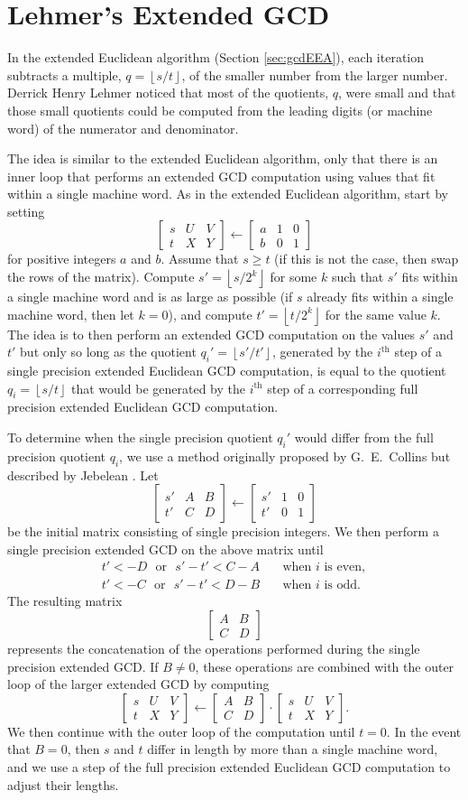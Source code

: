 \documentclass{ucalgthes1}
\theoremstyle{definition}
\newcommand{\matrixtt}[4]{\left[ \begin{array}{rr} #1 & #2 \\ #3 & #4 \end{array} \right]}
\newcommand{\matrixThreeTwo}[6]{\left[ \begin{array}{rrr} #1 & #2 & #3 \\ #4 & #5 & #6 \end{array} \right]}
\newcommand{\floor}[1]{\left\lfloor #1 \right\rfloor}
\newcommand{\ith}{i^{\textrm{th}}}
\begin{document}
\section{Lehmer's Extended GCD}
\label{sec:gcdLehmer}


In the extended Euclidean algorithm (Section \ref{sec:gcdEEA}), each iteration subtracts a multiple, \mbox{$q = \floor{s / t}$}, of the smaller number from the larger number.  Derrick Henry Lehmer \cite{Lehmer1938} noticed that most of the quotients, $q$, were small and that those small quotients could be computed from the leading digits (or machine word) of the numerator and denominator.

The idea is similar to the extended Euclidean algorithm, only that there is an inner loop that performs an extended GCD computation using values that fit within a single machine word.  As in the extended Euclidean algorithm, start by setting
\[
	\matrixThreeTwo{s}{U}{V}{t}{X}{Y} \gets \matrixThreeTwo{a}{1}{0}{b}{0}{1}
\]
for positive integers $a$ and $b$.  Assume that $s \ge t$ (if this is not the case, then swap the rows of the matrix).  Compute $s'=\floor{s/2^k}$ for some $k$ such that $s'$ fits within a single machine word and is as large as possible (if $s$ already fits within a single machine word, then let $k=0$), and compute $t' = \floor{t/2^k}$ for the same value $k$.  The idea is to then perform an extended GCD computation on the values $s'$ and $t'$ but only so long as the quotient ${q_i}' = \floor{s'/t'}$, generated by the $\ith$ step of a single precision extended Euclidean GCD computation, is equal to the quotient $q_i=\floor{s/t}$ that would be generated by the $\ith$ step of a corresponding full precision extended Euclidean GCD computation.

To determine when the single precision quotient ${q_i}'$ would differ from the full precision quotient $q_i$, we use a method originally proposed by G.\ E.\ Collins but described by Jebelean \cite[Theorem 1]{Jebelean1993}.  Let
\[
\matrixThreeTwo{s'}{A}{B}{t'}{C}{D} \gets \matrixThreeTwo{s'}{1}{0}{t'}{0}{1}
\]
be the initial matrix consisting of single precision integers.  We then perform a single precision extended GCD on the above matrix until
\begin{align*}
  t' < -D \textrm{~~or~~} s' - t' < C - A &\textrm{~~~when $i$ is even}, \\
  t' < -C \textrm{~~or~~} s' - t' < D - B &\textrm{~~~when $i$ is odd}.
\end{align*}
The resulting matrix
\[
	\matrixtt{A}{B}{C}{D}
\]
represents the concatenation of the operations performed during the single precision extended GCD.  If $B \neq 0$, these operations are combined with the outer loop of the larger extended GCD by computing
\[
\matrixThreeTwo{s}{U}{V}{t}{X}{Y} \gets \matrixtt{A}{B}{C}{D}
		        \cdot \matrixThreeTwo{s}{U}{V}{t}{X}{Y}.
\]
We then continue with the outer loop of the computation until $t = 0$.  In the event that $B=0$, then $s$ and $t$ differ in length by more than a single machine word, and we use a step of the full precision extended Euclidean GCD computation to adjust their lengths.
\end{document}
